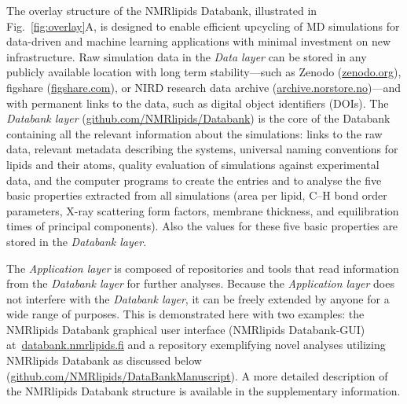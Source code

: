 \documentclass[fleqn,10pt]{wlscirep}
\begin{document}
The overlay structure of the NMRlipids Databank, illustrated in Fig.~\ref{fig:overlay}A, is designed to enable efficient upcycling of MD simulations for data-driven and machine learning applications with minimal investment on new infrastructure. Raw simulation data in the {\it Data layer} can be stored in any publicly available location with long term stability---such as Zenodo (\href{https://zenodo.org}{zenodo.org}), figshare (\href{https://figshare.com}{figshare.com}), or NIRD research data archive (\href{https://archive.norstore.no}{archive.norstore.no})---and with permanent links to the data, such as digital object identifiers (DOIs). 
The {\it Databank layer} (\href{https://github.com/NMRlipids/Databank}{github.com/NMRlipids/Databank}) is the core of the Databank containing all the relevant information about the simulations: links to the raw data, relevant metadata describing the systems, universal naming conventions for lipids and their atoms, quality evaluation of simulations against experimental data, and the computer programs to create the entries and to analyse the five basic properties extracted from all simulations (area per lipid, C--H bond order parameters, X-ray scattering form factors, membrane thickness, and equilibration times of principal components). Also the values for these five basic properties are stored in the {\it Databank layer}. 

The {\it Application layer} is composed of repositories and tools that read information from the {\it Databank layer} for further analyses. Because the {\it Application layer} does not interfere with the {\it Databank layer}, it can be freely extended by anyone for a wide range of purposes. This is demonstrated here with two examples: the NMRlipids Databank graphical user interface (NMRlipids Databank-GUI) at~\href{https://www.databank.nmrlipids.fi}{databank.nmrlipids.fi} and a repository exemplifying novel analyses utilizing NMRlipids Databank as discussed below (\href{https://github.com/NMRlipids/DataBankManuscript}{github.com/NMRlipids/DataBankManuscript}). A more detailed description of the NMRlipids Databank structure is available in the supplementary information. 
\end{document}
